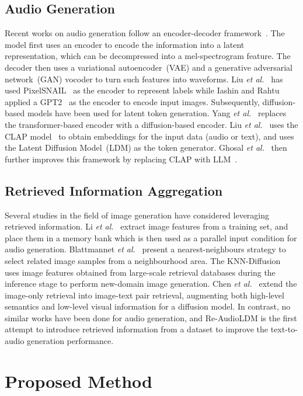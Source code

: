 \documentclass{article}
\begin{document}
\subsection{Audio Generation}  
Recent works on audio generation follow an encoder-decoder framework~\cite{audioldm,leveraging}. The model first uses an encoder to encode the information into a latent representation, which can be decompressed into a mel-spectrogram feature. The decoder then uses a variational autoencoder~(VAE) and a generative adversarial network~(GAN) vocoder to turn such features into waveforms. Liu \textit{et al.}~\cite{Liu-tts} has used PixelSNAIL~\cite{pixelsnail} as the encoder to represent labels while Iashin and Rahtu ~\cite{specvqgan} applied a GPT2~\cite{gpt2} as the encoder to encode input images. Subsequently, diffusion-based models have been used for latent token generation. Yang \textit{et al.}~\cite{diffsound} replaces the transformer-based encoder with a diffusion-based encoder. Liu \textit{et al.}~\cite{audioldm} uses the CLAP model~\cite{clip} to obtain embeddings for the input data (audio or text), and uses the Latent Diffusion Model~(LDM) as the token generator. Ghosal \textit{et al.}~\cite{tango} then further improves this framework by replacing CLAP with LLM~\cite{t5}. 

\subsection{Retrieved Information Aggregation}
Several studies in the field of image generation have considered leveraging retrieved information. Li \textit{et al.}~\cite{Li2022} extract image features from a training set, and place them in a memory bank which is then used as a parallel input condition for audio generation. Blattmannet \textit{et al.}~\cite{blattmann2022} present a nearest-neighbours strategy to select related image samples from a neighbourhood area. The KNN-Diffusion~\cite{sheynin2022} uses image features obtained from large-scale retrieval databases during the inference stage to perform new-domain image generation. Chen \textit{et al.}~\cite{reimagen} extend the image-only retrieval into image-text pair retrieval, augmenting both high-level semantics and low-level visual information for a diffusion model. In contrast, no similar works have been done for audio generation, and Re-AudioLDM is the first attempt to introduce retrieved information from a dataset to improve the text-to-audio generation performance. 

\section{Proposed Method}
\label{sec:method}
\end{document}
